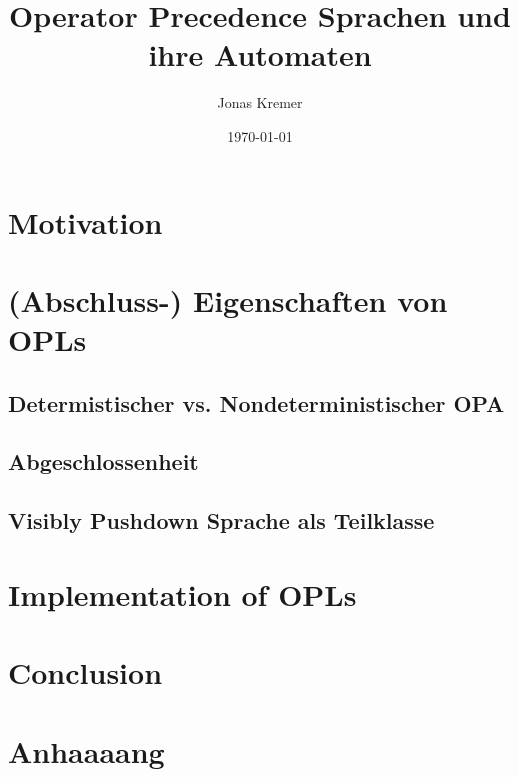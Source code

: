 \documentclass{article}
\author{Jonas Kremer}
\title{Operator Precedence Sprachen und ihre Automaten}
\date{\today{}}
\theoremstyle{remark}
\begin{document}
\maketitle
\newpage
\tableofcontents
\newpage

\section{Motivation}




\section{(Abschluss-) Eigenschaften von OPLs}

\subsection{Determistischer vs. Nondeterministischer OPA}

\subsection{Abgeschlossenheit}

\subsection{Visibly Pushdown Sprache als Teilklasse}

\section{Implementation of OPLs}

\section{Conclusion}

\appendix

\section{Anhaaaang}


\end{document}

